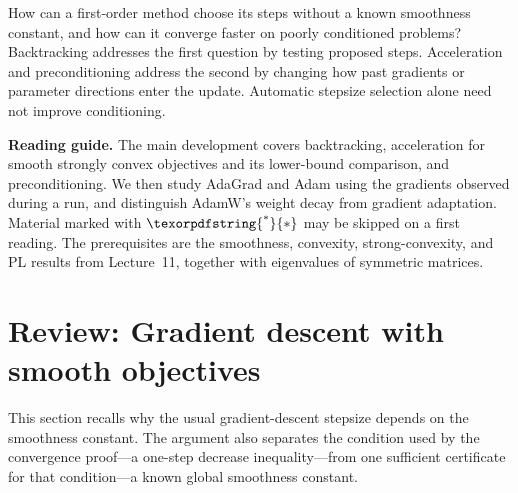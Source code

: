 \documentclass[11pt,twoside]{article}
\newcommand{\suppmark}{\texorpdfstring{\textsuperscript{*}}{*}}
\theoremstyle{definition}
\theoremstyle{remark}
\begin{document}
\begin{center}
\end{center}

How can a first-order method choose its steps without a known smoothness
constant, and how can it converge faster on poorly conditioned problems?
Backtracking addresses the first question by testing proposed steps.
Acceleration and preconditioning address the second by changing how past
gradients or parameter directions enter the update. Automatic stepsize
selection alone need not improve conditioning.

\noindent\textbf{Reading guide.}
The main development covers backtracking, acceleration for smooth strongly
convex objectives and its lower-bound comparison, and preconditioning.
We then study AdaGrad and Adam using the gradients observed during a run,
and distinguish AdamW's weight decay from gradient adaptation. Material
marked with $\suppmark$ may be skipped on a first reading. The prerequisites
are the smoothness, convexity, strong-convexity, and PL results from
Lecture~11, together with eigenvalues of symmetric matrices.

\section{Review: Gradient descent with smooth objectives}
\label{sec:tuning-problem}

This section recalls why the usual gradient-descent stepsize depends on the
smoothness constant. The argument also separates the condition used by the
convergence proof---a one-step decrease inequality---from one sufficient
certificate for that condition---a known global smoothness constant.
\end{document}
